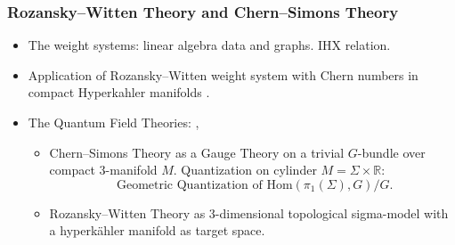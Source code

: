 \documentclass{article}
\newcommand{\R}{\mathbb{R}}
\begin{document}
\subsubsection*{Rozansky--Witten Theory and Chern--Simons Theory}
\begin{itemize}
    \item The weight systems: linear algebra data and graphs. IHX relation. \cite{sawon2004rozanskywitteninvariantshyperkahlermanifolds}
    \item Application of Rozansky--Witten weight system with Chern numbers in compact Hyperkahler manifolds \cite{hitchin1999curvaturecharacteristicnumbershyperkahler}.
    \item The Quantum Field Theories: \cite{qftjones}, \cite{rozansky1997hyperkahlergeometryinvariantsthreemanifolds}
    \begin{itemize}
        \item Chern--Simons Theory as a Gauge Theory on a trivial $G$-bundle over compact $3$-manifold $M$. Quantization \cite{Axelrod:1989xt} on cylinder $M=\Sigma\times \R$:
$$
\mbox{ Geometric Quantization of }\mathrm{Hom}(\pi_1(\Sigma),G)/G.
$$
    \item Rozansky--Witten Theory as 3-dimensional topological sigma-model with a hyperkähler manifold as target space.
    \end{itemize}
\end{itemize}

\printbibliography
\end{document}
